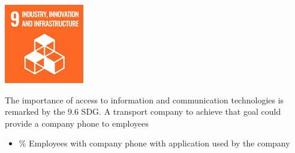 \begin{minipage}[c]{0.2\textwidth}
    \includegraphics[width=\textwidth]{Images/Social_sustainability/9_industry.png}
\end{minipage}
\begin{minipage}[c]{0.8\textwidth}
The importance of access to information and communication technologies is remarked by the 9.6 SDG. A transport company to achieve that goal could provide a company phone to employees

\begin{itemize}
    \item \% Employees with company phone with application used by the company
\end{itemize}
\end{minipage}


